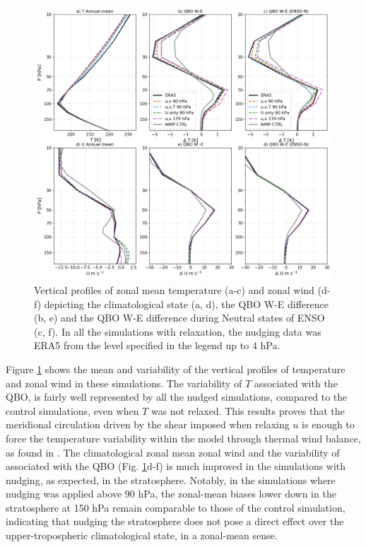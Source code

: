 \begin{figure}[t!]
\centering
 \includegraphics[width=\linewidth]{figures/profilUTclimatology.png}
\caption[Nudging sensitivity QBO profiles]{Vertical profiles of zonal mean temperature (a-c) and zonal wind (d-f) depicting the climatological state (a, d), the QBO W-E difference (b, e) and the QBO W-E difference during Neutral states of ENSO (c, f). In all the simulations with relaxation, the nudging data was ERA5 from the level specified in the legend up to 4 hPa.}
\label{fig:prof_nudg}
\end{figure}

Figure \ref{fig:prof_nudg} shows the mean and variability of the vertical profiles of temperature and zonal wind in these simulations. The variability of $T$ associated with the QBO, is fairly well represented by all the nudged simulations, compared to the control simulations, even when $T$ was not relaxed. This results proves that the meridional circulation driven by the shear imposed when relaxing $u$ is enough to force the temperature variability within the model through thermal wind balance, as found in \cite{martin2021}. 
The climatological zonal mean zonal wind and the variability of associated with the QBO (Fig. \ref{fig:prof_nudg}d-f) is much improved in the simulations with nudging, as expected, in the stratosphere. Notably, in the simulations where nudging was applied above 90 hPa, the zonal-mean biases lower down in the stratosphere at 150 hPa remain comparable to those of the control simulation, indicating that nudging the stratosphere does not pose a direct effect over the upper-tropospheric climatological state, in a zonal-mean sense.

